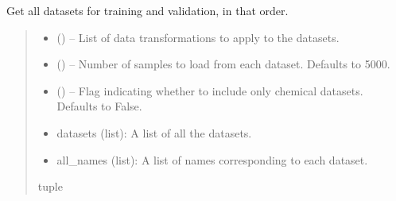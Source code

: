 \documentclass[letterpaper,10pt,english]{sphinxhowto}
\begin{document}
\begin{fulllineitems}
\label{\detokenize{datasets:datasets.get_all_datasets}}
\pysigstartsignatures
{}
\pysigstopsignatures
\sphinxAtStartPar
Get all datasets for training and validation, in that order.
\begin{quote}\begin{description}
\begin{itemize}
\item {} 
\sphinxAtStartPar
{} () – List of data transformations to apply to the datasets.

\item {} 
\sphinxAtStartPar
{} (\sphinxstyleliteralemphasis{\sphinxupquote{, }}) – Number of samples to load from each dataset. Defaults to 5000.

\item {} 
\sphinxAtStartPar
{} (\sphinxstyleliteralemphasis{\sphinxupquote{, }}) – Flag indicating whether to include only chemical datasets. Defaults to False.

\end{itemize}

\sphinxAtStartPar
\begin{description}
\begin{itemize}
\item {} 
\sphinxAtStartPar
datasets (list): A list of all the datasets.

\item {} 
\sphinxAtStartPar
all\_names (list): A list of names corresponding to each dataset.

\end{itemize}

\end{description}


\sphinxAtStartPar
tuple

\end{description}\end{quote}

\end{fulllineitems}
\end{document}
